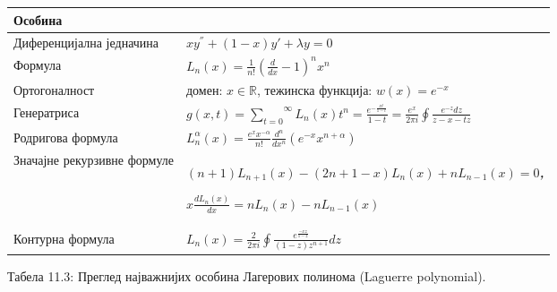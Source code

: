 {\def\LTcaptype{none} %
\begin{longtable}[]{@{}
  >{\raggedright\arraybackslash}p{}
  >{\centering\arraybackslash}p{}@{}}
\toprule\noalign{}
\begin{minipage}[b]{\linewidth}\raggedright
Особина
\end{minipage} & \begin{minipage}[b]{\linewidth}\centering
\end{minipage} \\
\midrule\noalign{}
\endhead
\bottomrule\noalign{}
\endlastfoot
Диференцијална једначина & \(xy^{''} + (1 - x)y' + \lambda y = 0\) \\
Формула & \(L_{n}(x) = \frac{1}{n!}{(\frac{d}{dx} - 1)}^{n}x^{n}\) \\
Ортогоналност & домен: \(x\mathbb{\in R}\), тежинска функција:
\(w(x) = e^{- x}\) \\
Генератриса &
\(g(x,t) = \overset{\infty}{\sum_{t = 0}}L_{n}(x)t^{n} = \frac{e^{- \frac{xt}{1 - t}}}{1 - t} = \frac{e^{x}}{2\pi i}\oint\frac{e^{- z}dz}{z - x - tz}\) \\
Родригова формула &
\(L_{n}^{\alpha}(x) = \frac{e^{x}x^{- \alpha}}{n!}\frac{d^{n}}{dx^{n}}(e^{- x}x^{n + \alpha})\) \\
Значајне рекурзивне формуле &
\((n + 1)L_{n + 1}(x) - (2n + 1 - x)L_{n}(x) + nL_{n - 1}(x) = 0\)\emph{\textbf{,}}

\(x\frac{dL_{n}(x)}{dx} = nL_{n}(x) - nL_{n - 1}(x)\) \\
Контурна формула &
\(L_{n}(x) = \frac{2}{2\pi i}\oint\frac{e^{\frac{- xz}{1 - z}}}{(1 - z)z^{n + 1}}dz\) \\
\end{longtable}
}

Табела 11.3: Преглед најважнијих особина Лагерових полинома (Laguerre
polynomial).

